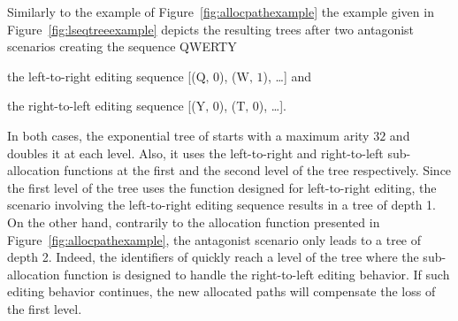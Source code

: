 Similarly to the example of Figure~\ref{fig:allocpathexample} the example given
in Figure~\ref{fig:lseqtreeexample} depicts the resulting trees after two
antagonist scenarios creating the sequence QWERTY \begin{inparaenum}[(i)] \item
  the left-to-right editing sequence [($\text{Q},\,0$), ($\text{W},\,1$),
  \ldots] and \item the right-to-left editing sequence [($\text{Y},\,0$),
  ($\text{T},\,0$), \ldots]. \end{inparaenum} In both cases, the exponential
tree of \LSEQ starts with a maximum arity $32$ and doubles it at each
level. Also, it uses the left-to-right and right-to-left sub-allocation
functions at the first and the second level of the tree respectively. Since the
first level of the tree uses the function designed for left-to-right editing,
the scenario involving the left-to-right editing sequence results in a tree of
depth 1. On the other hand, contrarily to the allocation function presented in
Figure~\ref{fig:allocpathexample}, the antagonist scenario only leads to a tree
of depth 2. Indeed, the identifiers of \LSEQ quickly reach a level of the tree
where the sub-allocation function is designed to handle the right-to-left
editing behavior. If such editing behavior continues, the new allocated paths
will compensate the loss of the first level.


